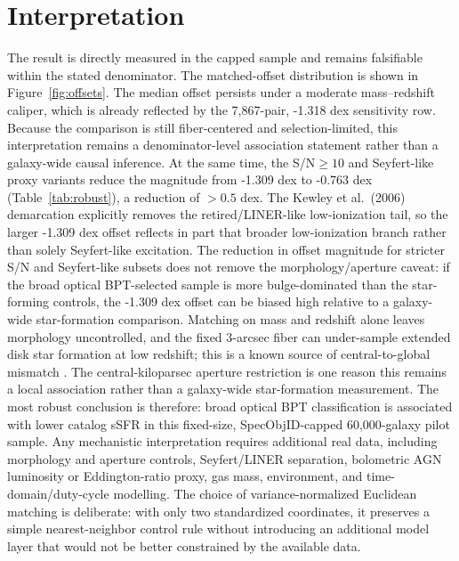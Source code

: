 \documentclass[twocolumn]{aastex631}
\begin{document}
\section{Interpretation}
The result is directly measured in the capped sample and remains falsifiable within the stated denominator. The matched-offset distribution is shown in Figure~\ref{fig:offsets}. The median offset persists under a moderate mass--redshift caliper, which is already reflected by the 7,867-pair, -1.318 dex sensitivity row. Because the comparison is still fiber-centered and selection-limited, this interpretation remains a denominator-level association statement rather than a galaxy-wide causal inference. At the same time, the S/N$\geq10$ and Seyfert-like proxy variants reduce the magnitude from -1.309 dex to -0.763 dex (Table~\ref{tab:robust}), a reduction of $>0.5$ dex. The Kewley et al.\ (2006) demarcation explicitly removes the retired/LINER-like low-ionization tail, so the larger -1.309 dex offset reflects in part that broader low-ionization branch rather than solely Seyfert-like excitation. The reduction in offset magnitude for stricter S/N and Seyfert-like subsets does not remove the morphology/aperture caveat: if the broad optical BPT-selected sample is more bulge-dominated than the star-forming controls, the -1.309 dex offset can be biased high relative to a galaxy-wide star-formation comparison. Matching on mass and redshift alone leaves morphology uncontrolled, and the fixed 3-arcsec fiber can under-sample extended disk star formation at low redshift; this is a known source of central-to-global mismatch \citep[e.g.,][]{harrison2017,ellison2021}. The central-kiloparsec aperture restriction is one reason this remains a local association rather than a galaxy-wide star-formation measurement. The most robust conclusion is therefore: broad optical BPT classification is associated with lower catalog sSFR in this fixed-size, SpecObjID-capped 60,000-galaxy pilot sample. Any mechanistic interpretation requires additional real data, including morphology and aperture controls, Seyfert/LINER separation, bolometric AGN luminosity or Eddington-ratio proxy, gas mass, environment, and time-domain/duty-cycle modelling.
The choice of variance-normalized Euclidean matching is deliberate: with only two standardized coordinates, it preserves a simple nearest-neighbor control rule without introducing an additional model layer that would not be better constrained by the available data.
\end{document}
